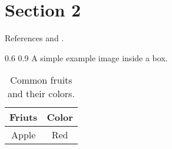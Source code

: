 
\section{Section 2}
References \parencite{Ref01}  and \parencite{Ref02}.

\begin{centerBoxImageStyle}
    {}     
    {0.6\linewidth}                         
    {0.9\linewidth}                         
    {A simple example image inside a box.}  
    {}               
\end{centerBoxImageStyle}


\begin{table}[h!] %
    \centering
    \begin{tabular}{|c|c|}     \hline
        Friuts & Color          \\ \hline
        Apple & Red             \\ \hline
    \end{tabular}
    \caption{Common fruits and their colors.}
\end{table}

